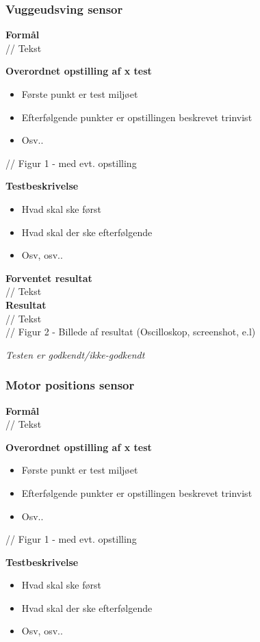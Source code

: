 \subsubsection{Vuggeudsving sensor}
\textbf{Formål} \\
// Tekst

\textbf{Overordnet opstilling af x test}

\begin{itemize}
	\item Første punkt er test miljøet
	\item Efterfølgende punkter er opstillingen beskrevet trinvist
	\item Osv..
\end{itemize}

// Figur 1 - med evt. opstilling

\textbf{Testbeskrivelse}
\begin{itemize}
	\item Hvad skal ske først
	\item Hvad skal der ske efterfølgende
	\item Osv, osv..
\end{itemize}

\textbf{Forventet resultat} \\
// Tekst \\
\textbf{Resultat} \\
// Tekst \\

// Figur 2 - Billede af resultat (Oscilloskop, screenshot, e.l)

\textit{Testen er godkendt/ikke-godkendt}
\subsubsection{Motor positions sensor}
\textbf{Formål} \\
// Tekst

\textbf{Overordnet opstilling af x test}

\begin{itemize}
	\item Første punkt er test miljøet
	\item Efterfølgende punkter er opstillingen beskrevet trinvist
	\item Osv..
\end{itemize}

// Figur 1 - med evt. opstilling

\textbf{Testbeskrivelse}
\begin{itemize}
	\item Hvad skal ske først
	\item Hvad skal der ske efterfølgende
	\item Osv, osv..
\end{itemize}

